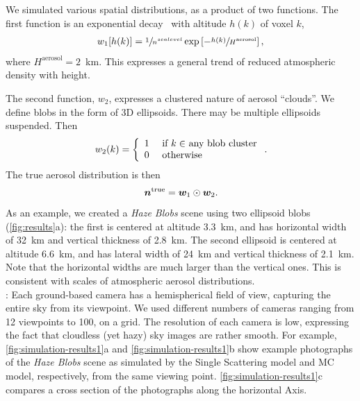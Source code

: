 \documentclass[10pt,letterpaper]{article}
\begin{document}
We simulated various spatial distributions, as a product of two
functions. The first function is an exponential decay~\cite{Levi1980}
with altitude $h(k)$ of voxel $k$,
\begin{align}
  w_1[h(k)] = \sfrac{1} {n^{sea level}}
  \exp\left[-\sfrac{h(k)}{H^\mathrm{aerosol}}\right],
\end{align}
where $H^\mathrm{aerosol}=2$~\si{\km}. This expresses a general trend
of reduced atmospheric density with height.

The second function, $w_2$, expresses a clustered nature of aerosol
``clouds''. We define blobs in the form of 3D ellipsoids. There may be
multiple ellipsoids suspended.  Then
\begin{equation}
  w_2(k) =
  \left\{
    \begin{array}{ll}
      1  & \mbox{ if $k\in$ any blob cluster} \\
      0  & \mbox{ otherwise}
      \label{eq:f2}
    \end{array}
  \right.
  .
  \hspace{-0.05cm}
\end{equation}
The true aerosol distribution is then
\begin{equation}
  \label{eq:ntrue}
  {\bm n}^{\rm true}={\bm w}_1\odot {\bm w}_2  .
  \hspace{-0.05cm}
\end{equation}
As an example, we created a {\em Haze Blobs} scene using two ellipsoid
blobs (\cref{fig:results}a): the first is centered at altitude
\SI{3.3}{\km}, and has horizontal width of \SI{32}{\km} and vertical
thickness of \SI{2.8}{\km}. The second ellipsoid is centered at
altitude \SI{6.6}{\km}, and has lateral width of \SI{24}{\km} and
vertical thickness of \SI{2.1}{\km}. Note that the horizontal widths
are much larger than the vertical ones. This is consistent with scales
of atmospheric aerosol distributions.
\\

: Each ground-based camera has a hemispherical
field of view, capturing the entire sky from its viewpoint. We used
different numbers of cameras ranging from 12 viewpoints to 100, on a
grid.  The resolution of each camera is low, expressing the fact that
cloudless (yet hazy) sky images are rather smooth.  For example,
\cref{fig:simulation-results1}a and \cref{fig:simulation-results1}b
show example photographs of the {\em Haze Blobs} scene as simulated by
the Single Scattering model and MC model, respectively, from the same
viewing point.  \cref{fig:simulation-results1}c compares a cross
section of the photographs along the horizontal Axis.
\end{document}
